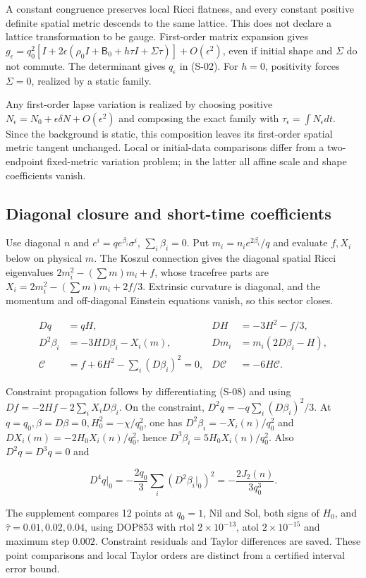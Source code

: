 A constant congruence preserves local Ricci flatness, and every constant positive definite spatial metric descends to the same lattice. This does not declare a lattice transformation to be gauge. First-order matrix expansion gives $g_\epsilon=q_0^2[I+2\epsilon(\rho_0I+\mathsf B_0+h\tau I+\Sigma\tau)]+O(\epsilon^2)$, even if initial shape and $\Sigma$ do not commute. The determinant gives $q_\epsilon$ in (S-02). For $h=0$, positivity forces $\Sigma=0$, realized by a static family.

Any first-order lapse variation is realized by choosing positive $N_\epsilon=N_0+\epsilon\delta N+O(\epsilon^2)$ and composing the exact family with $\tau_\epsilon=\int N_\epsilon dt$. Since the background is static, this composition leaves its first-order spatial metric tangent unchanged. Local or initial-data comparisons differ from a two-endpoint fixed-metric variation problem; in the latter all affine scale and shape coefficients vanish.

\subsection{Diagonal closure and short-time coefficients}

Use diagonal $n$ and $e^i=qe^{\beta_i}\sigma^i$, $\sum_i\beta_i=0$. Put $m_i=n_ie^{2\beta_i}/q$ and evaluate $f,X_i$ below on physical $m$. The Koszul connection gives the diagonal spatial Ricci eigenvalues $2m_i^2-(\sum m)m_i+f$, whose tracefree parts are $X_i=2m_i^2-(\sum m)m_i+2f/3$. Extrinsic curvature is diagonal, and the momentum and off-diagonal Einstein equations vanish, so this sector closes.

\begin{equation}\tag{S-08}\label{eq:S-08}
\begin{aligned}
Dq&=qH,& DH&=-3H^2-f/3,\\
D^2\beta_i&=-3HD\beta_i-X_i(m),& Dm_i&=m_i(2D\beta_i-H),\\
\mathcal C&=f+6H^2-\sum_i(D\beta_i)^2=0,&D\mathcal C&=-6H\mathcal C.
\end{aligned}
\end{equation}

Constraint propagation follows by differentiating (S-08) and using $Df=-2Hf-2\sum_iX_iD\beta_i$. On the constraint, $D^2q=-q\sum_i(D\beta_i)^2/3$. At $q=q_0,\beta=D\beta=0,H_0^2=-\chi/q_0^2$, one has $D^2\beta_i=-X_i(n)/q_0^2$ and $DX_i(m)=-2H_0X_i(n)/q_0^2$, hence $D^3\beta_i=5H_0X_i(n)/q_0^2$. Also $D^2q=D^3q=0$ and

\begin{equation}\tag{S-09}\label{eq:S-09}
D^4q\big|_0=-\frac{2q_0}{3}\sum_i(D^2\beta_i|_0)^2=-\frac{2J_2(n)}{3q_0^3}.
\end{equation}

The supplement compares 12 points at $q_0=1$, Nil and Sol, both signs of $H_0$, and $\hat\tau=0.01,0.02,0.04$, using DOP853 with rtol $2\times10^{-13}$, atol $2\times10^{-15}$ and maximum step $0.002$. Constraint residuals and Taylor differences are saved. These point comparisons and local Taylor orders are distinct from a certified interval error bound.
